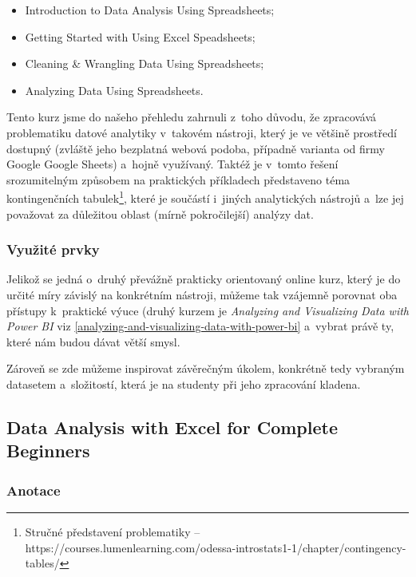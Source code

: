 \begin{itemize}
\tightlist
\item
  Introduction to Data Analysis Using Spreadsheets;
\item
  Getting Started with Using Excel Speadsheets;
\item
  Cleaning \& Wrangling Data Using Spreadsheets;
\item
  Analyzing Data Using Spreadsheets.
\end{itemize}

Tento kurz jsme do našeho přehledu zahrnuli z~toho důvodu, že zpracovává problematiku datové analytiky v~takovém nástroji, který je ve většině prostředí dostupný (zvláště jeho bezplatná webová podoba, případně varianta od firmy Google Google Sheets) a~hojně využívaný. Taktéž je v~tomto řešení srozumitelným způsobem na praktických příkladech představeno téma kontingenčních tabulek\footnote{Stručné představení problematiky – https://courses.lumenlearning.com/odessa-introstats1-1/chapter/contingency-tables/}, které je součástí i~jiných analytických nástrojů a~lze jej považovat za důležitou oblast (mírně pokročilejší) analýzy dat.

\hypertarget{vyuux17eituxe9-prvky-6}{%
\subsubsection{Využité prvky}\label{vyuux17eituxe9-prvky-6}}

Jelikož se jedná o~druhý převážně prakticky orientovaný online kurz, který je do určité míry závislý na konkrétním nástroji, můžeme tak vzájemně porovnat oba přístupy k~praktické výuce (druhý kurzem je \emph{Analyzing and Visualizing Data with Power BI} viz \ref{analyzing-and-visualizing-data-with-power-bi} a~vybrat právě ty, které nám budou dávat větší smysl.

Zároveň se zde můžeme inspirovat závěrečným úkolem, konkrétně tedy vybraným datasetem a~složitostí, která je na studenty při jeho zpracování kladena.

\hypertarget{data-analysis-with-excel-for-complete-beginners}{%
\subsection{Data Analysis with Excel for Complete Beginners}\label{data-analysis-with-excel-for-complete-beginners}}

\hypertarget{anotace-6}{%
\subsubsection{Anotace}\label{anotace-6}}

